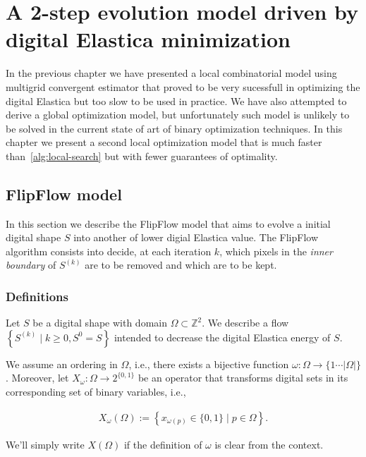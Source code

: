 \chapter{A 2-step evolution model driven by digital Elastica minimization}
\label{chapter:flip-flow}

In the previous chapter we have presented a local combinatorial model using multigrid convergent estimator that proved to be very sucessfull in optimizing the digital Elastica but too slow to be used in practice. We have also attempted to derive a global optimization model, but unfortunately such model is unlikely to be solved in the current state of art of binary optimization techniques. In this chapter we present a second local optimization model that is much faster than~\cref{alg:local-search} but with fewer guarantees of optimality.

\section{FlipFlow model}
\label{ch7:sec:flipflow-model}

In this section we describe the FlipFlow model that aims to evolve a initial digital shape $S$ into another of lower digial Elastica value. The FlipFlow algorithm consists into decide, at each iteration $k$, which pixels in the \emph{inner boundary} of $S^{(k)}$ are to be removed  and which are to be kept. 

\subsection{Definitions}
\label{ch7:subsec:definitions}

Let $S$ be a digital shape with domain $\Omega \subset \mathbb{Z}^2$. We describe a flow $\left \{ S^{(k)} \; | \; k \geq 0, S^{0} = S \right\}$ intended to decrease the digital Elastica energy of $S$.

We assume an ordering in $\Omega$, i.e., there exists a bijective function $\omega : \Omega \rightarrow \{1 \cdots |\Omega| \}$. Moreover, let $X_{\omega}:\Omega \rightarrow 2^{\{0,1\}}$ be an operator that transforms digital sets in its corresponding set of binary variables, i.e.,

\begin{align*}
	X_{\omega}(\Omega) := \left\{ x_{\omega(p)} \in \{0,1\} \; | \; p \in \Omega \right\}.
\end{align*}

We'll simply write $X(\Omega)$ if the definition of $\omega$ is clear from the context.

